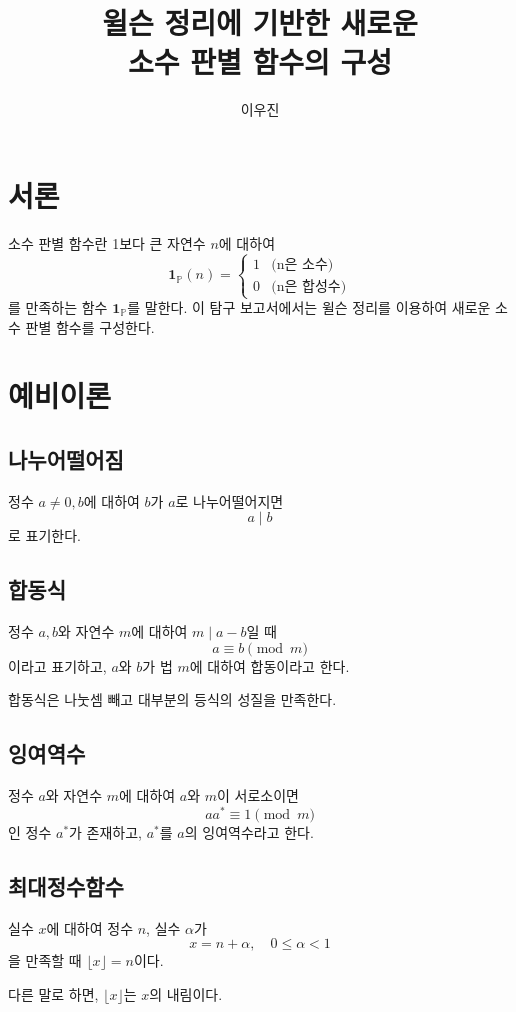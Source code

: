 \documentclass{article}
\title{윌슨 정리에 기반한 새로운\\소수 판별 함수의 구성}
\author{이우진}
\date{}
\begin{document}
\maketitle

\section{서론}
소수 판별 함수란 1보다 큰 자연수 \(n\)에 대하여
\[\mathbf{1}_{\mathbb{P}}(n) = 
\begin{cases}
    1 & \text{(n은 소수)} \\
    0 & \text{(n은 합성수)}
\end{cases}\]
를 만족하는 함수 \(\mathbf{1}_{\mathbb{P}}\)를 말한다.
이 탐구 보고서에서는 윌슨 정리를 이용하여 새로운 소수 판별 함수를 구성한다.

\section{예비이론}
\subsection{나누어떨어짐}
정수 \(a \ne 0, b\)에 대하여 \(b\)가 \(a\)로 나누어떨어지면
\[a \mid b\]
로 표기한다.

\subsection{합동식}
정수 \(a, b\)와 자연수 \(m\)에 대하여 \(m \mid a-b\)일 때
\[a \equiv b \pmod m\]
이라고 표기하고, \(a\)와 \(b\)가 법 \(m\)에 대하여 합동이라고 한다.

합동식은 나눗셈 빼고 대부분의 등식의 성질을 만족한다.

\subsection{잉여역수}
정수 \(a\)와 자연수 \(m\)에 대하여 \(a\)와 \(m\)이 서로소이면 \[aa^{*} \equiv 1 \pmod m\] 인 정수 \(a^{*}\)가 존재하고, \(a^{*}\)를 \(a\)의 잉여역수라고 한다.

\subsection{최대정수함수}
실수 \(x\)에 대하여 정수 \(n\), 실수 \(\alpha\)가 \[x=n+\alpha, \quad 0 \le \alpha < 1\]을 만족할 때 \(\lfloor x \rfloor = n\)이다.

다른 말로 하면, \(\lfloor x \rfloor\)는 \(x\)의 내림이다.
\end{document}
